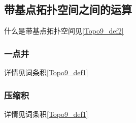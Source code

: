 
\subsection{带基点拓扑空间之间的运算}

什么是带基点拓扑空间见\autoref{Topo9_def2}~

\subsubsection{一点并}

详情见词条积\autoref{Topo9_def1}~


\subsubsection{压缩积}

详情见词条积\autoref{Topo9_def1}~




